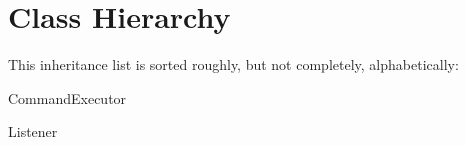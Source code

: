 \section{Class Hierarchy}
This inheritance list is sorted roughly, but not completely, alphabetically\+:\begin{DoxyCompactList}
\item Command\+Executor\begin{DoxyCompactList}
\item {}
\end{DoxyCompactList}
\item Listener\begin{DoxyCompactList}
\item {}
\end{DoxyCompactList}
\end{DoxyCompactList}
